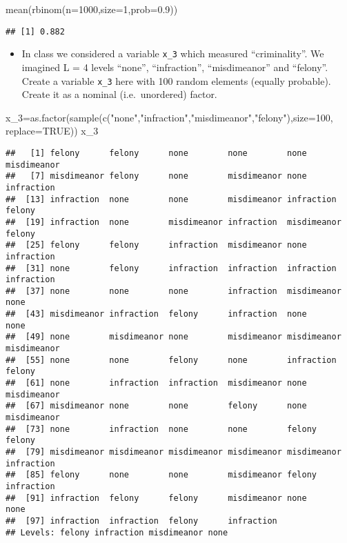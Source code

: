 \documentclass[
]{article}
\newenvironment{Shaded}{\begin{snugshade}}{\end{snugshade}}
\newcommand{\AttributeTok}[1]{\textcolor[rgb]{0.77,0.63,0.00}{#1}}
\newcommand{\ConstantTok}[1]{\textcolor[rgb]{0.00,0.00,0.00}{#1}}
\newcommand{\DecValTok}[1]{\textcolor[rgb]{0.00,0.00,0.81}{#1}}
\newcommand{\FloatTok}[1]{\textcolor[rgb]{0.00,0.00,0.81}{#1}}
\newcommand{\FunctionTok}[1]{\textcolor[rgb]{0.00,0.00,0.00}{#1}}
\newcommand{\NormalTok}[1]{#1}
\newcommand{\OtherTok}[1]{\textcolor[rgb]{0.56,0.35,0.01}{#1}}
\newcommand{\StringTok}[1]{\textcolor[rgb]{0.31,0.60,0.02}{#1}}
\providecommand{\tightlist}{%
  \setlength{\itemsep}{0pt}\setlength{\parskip}{0pt}}
\begin{document}
\begin{Shaded}
\begin{Highlighting}[]
\FunctionTok{mean}\NormalTok{(}\FunctionTok{rbinom}\NormalTok{(}\AttributeTok{n=}\DecValTok{1000}\NormalTok{,}\AttributeTok{size=}\DecValTok{1}\NormalTok{,}\AttributeTok{prob=}\FloatTok{0.9}\NormalTok{))}
\end{Highlighting}
\end{Shaded}

\begin{verbatim}
## [1] 0.882
\end{verbatim}

\begin{itemize}
\tightlist
\item
  In class we considered a variable \texttt{x\_3} which measured
  ``criminality''. We imagined L = 4 levels ``none'', ``infraction'',
  ``misdimeanor'' and ``felony''. Create a variable \texttt{x\_3} here
  with 100 random elements (equally probable). Create it as a nominal
  (i.e.~unordered) factor.
\end{itemize}

\begin{Shaded}
\begin{Highlighting}[]
\NormalTok{x\_3}\OtherTok{=}\FunctionTok{as.factor}\NormalTok{(}\FunctionTok{sample}\NormalTok{(}\FunctionTok{c}\NormalTok{(}\StringTok{"none"}\NormalTok{,}\StringTok{"infraction"}\NormalTok{,}\StringTok{"misdimeanor"}\NormalTok{,}\StringTok{"felony"}\NormalTok{),}\AttributeTok{size=}\DecValTok{100}\NormalTok{, }\AttributeTok{replace=}\ConstantTok{TRUE}\NormalTok{))}
\NormalTok{x\_3}
\end{Highlighting}
\end{Shaded}

\begin{verbatim}
##   [1] felony      felony      none        none        none        misdimeanor
##   [7] misdimeanor felony      none        misdimeanor none        infraction 
##  [13] infraction  none        none        misdimeanor infraction  felony     
##  [19] infraction  none        misdimeanor infraction  misdimeanor felony     
##  [25] felony      felony      infraction  misdimeanor none        infraction 
##  [31] none        felony      infraction  infraction  infraction  infraction 
##  [37] none        none        none        infraction  misdimeanor none       
##  [43] misdimeanor infraction  felony      infraction  none        none       
##  [49] none        misdimeanor none        misdimeanor misdimeanor misdimeanor
##  [55] none        none        felony      none        infraction  felony     
##  [61] none        infraction  infraction  misdimeanor none        misdimeanor
##  [67] misdimeanor none        none        felony      none        misdimeanor
##  [73] none        infraction  none        none        felony      felony     
##  [79] misdimeanor misdimeanor misdimeanor misdimeanor misdimeanor infraction 
##  [85] felony      none        none        misdimeanor felony      infraction 
##  [91] infraction  felony      felony      misdimeanor none        none       
##  [97] infraction  infraction  felony      infraction 
## Levels: felony infraction misdimeanor none
\end{verbatim}
\end{document}
